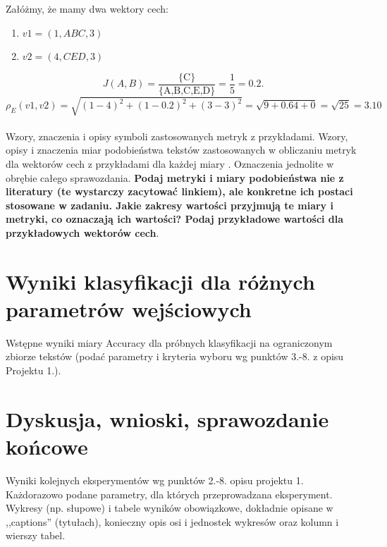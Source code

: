 \documentclass{article}
\begin{document}
Załóżmy, że mamy dwa wektory cech:
\begin{enumerate}
    \item \(v1 = (1, ABC, 3)\)
    \item \(v2 = (4, CED, 3)\)
\end{enumerate}
\[
    J(A, B) = \frac{\{ \text{C} \}}{\{\text{A,B,C,E,D}\}} = \frac{1}{5}= 0.2.
 \]
 \[
     \rho_E(v1, v2) = \sqrt{(1-4)^2 + (1 - 0.2)^2 + (3-3)^2} = \sqrt{9 + 0.64 + 0} = \sqrt{25} = 3.10
\] \\


Wzory, znaczenia i opisy symboli zastosowanych metryk z
przykładami. Wzory, opisy i znaczenia miar
podobieństwa tekstów zastosowanych w obliczaniu metryk dla wektorów cech z
przykładami dla każdej miary \cite{niewiadomski08}.  Oznaczenia jednolite w obrębie całego sprawozdania.  {\bf Podaj metryki i miary
podobieństwa nie z literatury (te wystarczy zacytować linkiem), ale konkretne ich
postaci stosowane w zadaniu. Jakie zakresy wartości przyjmują te miary i
metryki, co oznaczają ich wartości? Podaj przykładowe wartości dla przykładowych wektorów cech}. \\ 

\section{Wyniki klasyfikacji dla różnych parametrów wejściowych}
Wstępne wyniki miary Accuracy dla próbnych klasyfikacji na ograniczonym zbiorze tekstów (podać parametry i kryteria
wyboru wg punktów 3.-8. z opisu Projektu 1.). 


\section{Dyskusja, wnioski, sprawozdanie końcowe}

Wyniki kolejnych eksperymentów wg punktów 2.-8. opisu projektu 1.  Każdorazowo
podane parametry, dla których przeprowadzana eksperyment. 
Wykresy (np. słupowe) i tabele wyników
obowiązkowe, dokładnie opisane w ,,captions'' (tytułach), konieczny opis osi i
jednostek wykresów oraz kolumn i wierszy tabel.\\ 
\end{document}
